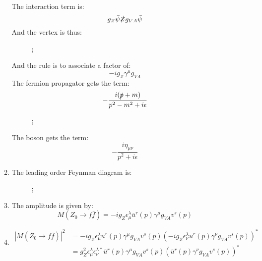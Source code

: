 \documentclass[12pt,a4]{article}
\begin{document}
\begin{enumerate}
\begin{enumerate}
        The interaction term is:
        \begin{equation*}
          g_Z \bar{\psi} \slashed{Z} g_{V A} \bar{\psi}
        \end{equation*}
        And the vertex is thus:
        \begin{figure}[!ht]
          \centering
          ;
        \end{figure}
        And the rule is to associate a factor of:
        \begin{equation*}
          - i g_Z \gamma^\mu g_{V A}
        \end{equation*}
        The fermion propagator gets the term:
        \begin{equation*}
          -\frac{i (\slashed{p} + m)}{p^2 - m^2+ i \epsilon}
        \end{equation*}
        \begin{figure}[!ht]
          \centering
          ;
        \end{figure}
        The boson gets the term:
        \begin{equation*}
          -\frac{i \eta_{\mu\nu}}{p^2 + i \epsilon}
        \end{equation*}
      \item
        The leading order Feynman diagram is:
        \begin{figure}[!ht]
          \centering
          ;
        \end{figure}
      \item
        The amplitude is given by:
        \begin{equation*}
          M(Z_0 \to f \bar{f}) = - i g_Z \epsilon_\mu^\lambda \bar{u}^r(p) \gamma^\mu g_{V A} v^s(p)
        \end{equation*}
      \item
        \begin{align*}
          |M(Z_0 \to f \bar{f})|^2 &= - i g_Z \epsilon_\mu^\lambda \bar{u}^r(p) \gamma^\mu g_{V A} v^s(p) (- i g_Z \epsilon_\nu^\lambda \bar{u}^r(p) \gamma^\nu g_{V A} v^s(p))^*\\
                                   &= g_Z^2 \epsilon_\mu^\lambda \epsilon_\nu^{\lambda *} \bar{u}^r(p) \gamma^\mu g_{V A} v^s(p) ( \bar{u}^r(p) \gamma^\nu g_{V A} v^s(p))^*

\end{align*}
\end{enumerate}
\end{enumerate}
\end{document}

